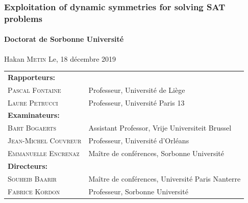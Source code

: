\documentclass{beamer}
\begin{document}
\author{Hakan \textsc{METIN}}


\begin{frame}
\frametitle{Exploitation of dynamic symmetries for solving SAT problems}
\framesubtitle{Doctorat de Sorbonne Université}

   Hakan \textsc{Metin} \hfill {\scriptsize  Le, 18 décembre 2019}\\
  \vfill

	\scriptsize
    \begin{tabular}{ll}
 	    \textbf{Rapporteurs:} & \\
    	\textsc{Pascal \textsc{Fontaine}}  & Professeur, Université de Liège\\
    	\vspace{1em}%
    	\textsc{Laure Petrucci}  & Professeur, Université Paris 13\\

 	    \textbf{Examinateurs:} & \\
   		\textsc{Bart Bogaerts} & Assistant Professor, Vrije Universiteit Brussel\\
    	\textsc{Jean-Michel	Couvreur}  & Professeur, Université d'Orléans\\
    	\vspace{1em}%
    	\textsc{Emmanuelle Encrenaz}  & Maître de conférences, Sorbonne Université\\




 	    \textbf{Directeurs:} & \\
    	\textsc{Souheib Baarir}  & Maître de conférences, Université Paris Nanterre\\
    	\textsc{Fabrice Kordon}  & Professeur, Sorbonne Université\\
    \end{tabular}\\


\end{frame}
\end{document}
